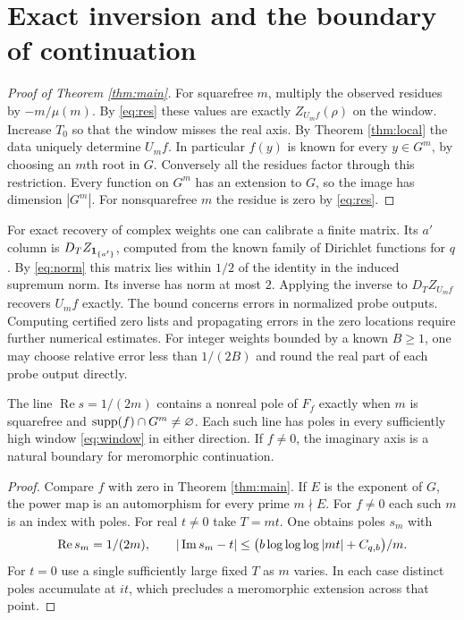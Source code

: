 \documentclass[11pt,letterpaper]{article}
\newcommand{\re}{\operatorname{Re}}\newcommand{\e}{\mathrm e}\newcommand{\dd}{\,\mathrm d}
\begin{document}
\section{Exact inversion and the boundary of continuation}
\begin{proof}[Proof of Theorem \ref{thm:main}]
For squarefree $m$, multiply the observed residues by $-m/\mu(m)$. By \eqref{eq:res} these values are exactly $Z_{U_m f}(\rho)$ on the window. Increase $T_0$ so that the window misses the real axis. By Theorem \ref{thm:local} the data uniquely determine $U_m f$. In particular $f(y)$ is known for every $y\in G^m$, by choosing an $m$th root in $G$. Conversely all the residues factor through this restriction. Every function on $G^m$ has an extension to $G$, so the image has dimension $|G^m|$. For nonsquarefree $m$ the residue is zero by \eqref{eq:res}.
\end{proof}

For exact recovery of complex weights one can calibrate a finite matrix. Its $a'$ column is $D_T Z_{\mathbf 1_{\{a'\}}}$, computed from the known family of Dirichlet functions for $q$. By \eqref{eq:norm} this matrix lies within $1/2$ of the identity in the induced supremum norm. Its inverse has norm at most $2$. Applying the inverse to $D_T Z_{U_m f}$ recovers $U_m f$ exactly. The bound concerns errors in normalized probe outputs. Computing certified zero lists and propagating errors in the zero locations require further numerical estimates. For integer weights bounded by a known $B\ge1$, one may choose relative error less than $1/(2B)$ and round the real part of each probe output directly.

\begin{corollary}\label{cor:boundary}
The line $\re s=1/(2m)$ contains a nonreal pole of $F_f$ exactly when $m$ is squarefree and $\operatorname{supp}(f)\cap G^m\ne\varnothing$. Each such line has poles in every sufficiently high window \eqref{eq:window} in either direction. If $f\ne0$, the imaginary axis is a natural boundary for meromorphic continuation.
\end{corollary}
\begin{proof}
Compare $f$ with zero in Theorem \ref{thm:main}. If $E$ is the exponent of $G$, the power map is an automorphism for every prime $m\nmid E$. For $f\ne0$ each such $m$ is an index with poles. For real $t\ne0$ take $T=mt$. One obtains poles $s_m$ with
\[
  \re s_m=1/(2m),\qquad
  |\imag s_m-t|\le \bigl(b\log\log\log|mt|+C_{q,b}\bigr)/m.
\]
For $t=0$ use a single sufficiently large fixed $T$ as $m$ varies. In each case distinct poles accumulate at $it$, which precludes a meromorphic extension across that point.
\end{proof}
\end{document}
